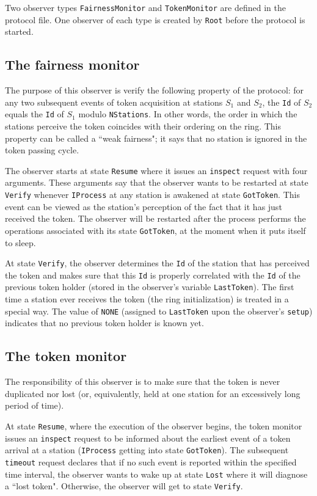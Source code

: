 Two observer types {\tt FairnessMonitor} and {\tt TokenMonitor} are defined
in the protocol file.
One observer of each type is created by {\tt Root} before the protocol
is started.

\subsection{The fairness monitor}

The purpose of this observer is verify the following property of the protocol:
for any two subsequent events of token acquisition at stations $S_1$ and
$S_2$, the {\tt Id} of $S_2$ equals the {\tt Id} of $S_1$ modulo
{\tt NStations}.
In other words, the order in which the stations perceive the token coincides
with their ordering on the ring.
This property can be called a
``weak fairness"; it says that no station is
ignored in the token passing cycle.

The observer starts at state {\tt Resume} where it issues an {\tt inspect}
request with four arguments.
These arguments say that the observer wants to be restarted at state
{\tt Verify} whenever {\tt IProcess} at any station is awakened at state
{\tt GotToken}.
This event can be viewed as the station's perception of the fact that it has
just received the token.
The observer will be restarted after the process performs the operations
associated with its state {\tt GotToken}, at the moment when it puts itself
to sleep.

At state {\tt Verify}, the observer determines the {\tt Id} of the station
that has perceived the token and makes sure that this {\tt Id} is properly
correlated with the {\tt Id} of the previous token holder (stored in the
observer's variable {\tt LastToken}).
The first time a station ever receives the token (the ring
initialization) is treated in a special way.
The value of {\tt NONE} (assigned to {\tt LastToken} upon the observer's
{\tt setup}) indicates that no previous token holder is known yet.

\subsection{The token monitor}

The responsibility of this observer is to make sure that the token is never
duplicated nor lost (or, equivalently,
held at one station for an excessively long period of time).

At state {\tt Resume}, where the execution of the observer begins, the
token monitor issues an {\tt inspect} request to be informed about the
earliest event
of a token arrival at a station ({\tt IProcess} getting into state
{\tt GotToken}).
The subsequent {\tt timeout} request declares that if no such event is reported
within the specified time interval, the observer wants to wake up at
state {\tt Lost} where it will diagnose a ``lost token".
Otherwise, the observer will get to state {\tt Verify}.

